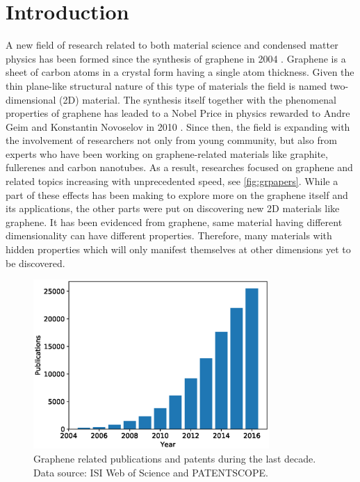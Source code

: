 
\chapter{Introduction \label{chap:1}}  %

\ifpdf
    \graphicspath{{Chapter1/Figs/Raster/}{Chapter1/Figs/PDF/}{Chapter1/Figs/}{Chapter1/Figs/Vector/}}
\else
    \graphicspath{{Chapter1/Figs/Vector/}{Chapter1/Figs/}}
\fi


A new field of research related to both material science and condensed matter physics has been formed since the synthesis of graphene in 2004 \cite{Novoselov666,Novoselov26072005}. Graphene is a sheet of carbon atoms in a crystal form having a single atom thickness. Given the thin plane-like structural nature of this type of materials the field is named two-dimensional (2D) material. The synthesis itself together with the phenomenal properties of graphene has leaded to a Nobel Price in physics rewarded to Andre Geim and Konstantin Novoselov in 2010 \cite{Geim2007}. Since then, the field is expanding with the involvement of researchers not only from young community, but also from experts who have been working on graphene-related materials like graphite, fullerenes and carbon nanotubes. As a result, researches focused on graphene and related topics increasing with unprecedented speed, see \autoref{fig:grpapers}. While a part of these effects has been making to explore more on the graphene itself and its applications, the other parts were put on discovering new 2D materials like graphene. It has been evidenced from graphene, same material having different dimensionality can have different properties. Therefore, many materials with hidden properties which will only manifest themselves at other dimensions yet to be discovered. 


\begin{figure}[htbp!] 
\centering  
\includegraphics[width=0.8\textwidth]{graphene_papers.eps}
\caption[Graphene publications]{Graphene related publications and patents during the last decade. Data source: ISI Web of Science and PATENTSCOPE. \protect\footnotemark }  
\label{fig:grpapers}
\end{figure} 

